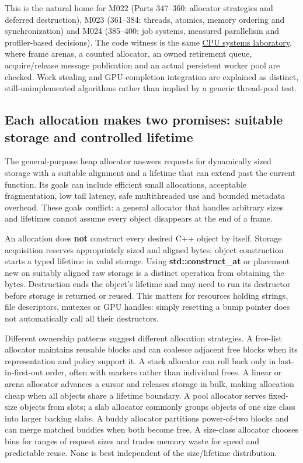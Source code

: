 This is the natural home for M022 (Parts 347--360: allocator strategies and deferred destruction), M023 (361--384: threads, atomics, memory ordering and synchronization) and M024 (385--400: job systems, measured parallelism and profiler-based decisions). The code witness is the same \hyperref[source-file-0060a91bd24dd25d6c14e679]{CPU systems laboratory}, where frame arenas, a counted allocator, an owned retirement queue, acquire/release message publication and an actual persistent worker pool are checked. Work stealing and GPU-completion integration are explained as distinct, still-unimplemented algorithms rather than implied by a generic thread-pool test.

\subsection{Each allocation makes two promises: suitable storage and controlled lifetime}\label{01-foundations-i-ch007-each-allocation-makes-two-promises-suitable-storage-and-controlled-lifetime}

The general-purpose heap allocator answers requests for dynamically sized storage with a suitable alignment and a lifetime that can extend past the current function. Its goals can include efficient small allocations, acceptable fragmentation, low tail latency, safe multithreaded use and bounded metadata overhead. These goals conflict: a general allocator that handles arbitrary sizes and lifetimes cannot assume every object disappears at the end of a frame.

An allocation does \textbf{not} construct every desired C++ object by itself. Storage acquisition reserves appropriately sized and aligned bytes; object construction starts a typed lifetime in valid storage. Using \textbf{std::construct\_at} or placement new on suitably aligned raw storage is a distinct operation from obtaining the bytes. Destruction ends the object's lifetime and may need to run its destructor before storage is returned or reused. This matters for resources holding strings, file descriptors, mutexes or GPU handles: simply resetting a bump pointer does not automatically call all their destructors.

Different ownership patterns suggest different allocation strategies. A free-list allocator maintains reusable blocks and can coalesce adjacent free blocks when its representation and policy support it. A stack allocator can roll back only in last-in-first-out order, often with markers rather than individual frees. A linear or arena allocator advances a cursor and releases storage in bulk, making allocation cheap when all objects share a lifetime boundary. A pool allocator serves fixed-size objects from slots; a slab allocator commonly groups objects of one size class into larger backing slabs. A buddy allocator partitions power-of-two blocks and can merge matched buddies when both become free. A size-class allocator chooses bins for ranges of request sizes and trades memory waste for speed and predictable reuse. None is best independent of the size/lifetime distribution.


